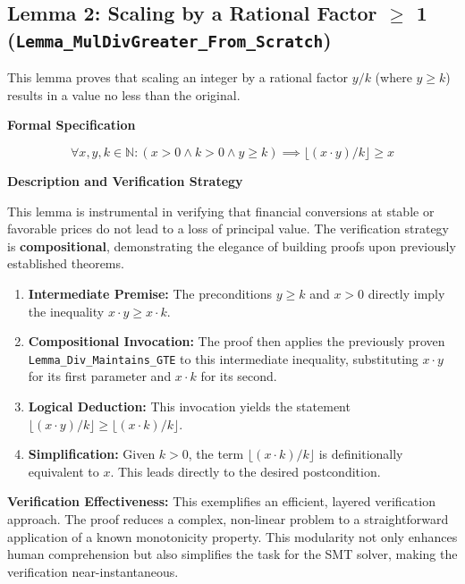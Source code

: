 \documentclass[
  english,
  onecolumn]{article}
\providecommand{\tightlist}{%
  \setlength{\itemsep}{0pt}\setlength{\parskip}{0pt}}
\begin{document}
\subsection{\texorpdfstring{\textbf{Lemma 2: Scaling by a Rational
Factor \(\geq\) 1
(\texttt{Lemma\_MulDivGreater\_From\_Scratch})}}{Lemma 2: Scaling by a Rational Factor \textbackslash geq 1 (Lemma\_MulDivGreater\_From\_Scratch)}}\label{lemma-2-scaling-by-a-rational-factor-geq-1-lemma_muldivgreater_from_scratch}

This lemma proves that scaling an integer by a rational factor \(y/k\)
(where \(y \ge k\)) results in a value no less than the original.

\textbf{Formal Specification}

\[
\forall x, y, k \in \mathbb{N} : (x > 0 \land k > 0 \land y \ge k) \implies \lfloor (x \cdot y) / k \rfloor \ge x
\]

\textbf{Description and Verification Strategy}

This lemma is instrumental in verifying that financial conversions at
stable or favorable prices do not lead to a loss of principal value. The
verification strategy is \textbf{compositional}, demonstrating the
elegance of building proofs upon previously established theorems.

\begin{enumerate}
\def\labelenumi{\arabic{enumi}.}
\tightlist
\item
  \textbf{Intermediate Premise:} The preconditions \(y \ge k\) and
  \(x > 0\) directly imply the inequality \(x \cdot y \ge x \cdot k\).
\item
  \textbf{Compositional Invocation:} The proof then applies the
  previously proven \texttt{Lemma\_Div\_Maintains\_GTE} to this
  intermediate inequality, substituting \(x \cdot y\) for its first
  parameter and \(x \cdot k\) for its second.
\item
  \textbf{Logical Deduction:} This invocation yields the statement
  \(\lfloor(x \cdot y)/k\rfloor \ge \lfloor(x \cdot k)/k\rfloor\).
\item
  \textbf{Simplification:} Given \(k > 0\), the term
  \(\lfloor(x \cdot k)/k\rfloor\) is definitionally equivalent to \(x\).
  This leads directly to the desired postcondition.
\end{enumerate}

\textbf{Verification Effectiveness:} This exemplifies an efficient,
layered verification approach. The proof reduces a complex, non-linear
problem to a straightforward application of a known monotonicity
property. This modularity not only enhances human comprehension but also
simplifies the task for the SMT solver, making the verification
near-instantaneous.
\end{document}
